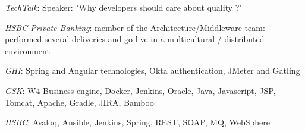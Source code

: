 \begin{cventries}
{{\begin{cvitems}
                \item{ \emph{TechTalk}: Speaker: "Why developers should care about quality ?"}
                \item{ \emph{HSBC Private Banking}: member of the Architecture/Middleware team: performed several deliveries and go live in a multicultural / distributed environment}
                \end{cvitems}
            }
            {
                \begin{cvitems} %
                    \item{\emph{GHI}: Spring and Angular technologies, Okta authentication, JMeter and Gatling}
                    \item{\emph{GSK}: W4 Business engine, Docker, Jenkins, Oracle, Java, Javascript, JSP, Tomcat, Apache, Gradle, JIRA, Bamboo}
                    \item{\emph{HSBC}: Avaloq, Ansible, Jenkins, Spring, REST, SOAP, MQ, WebSphere}
                \end{cvitems}
            }
        }


\end{cventries}
